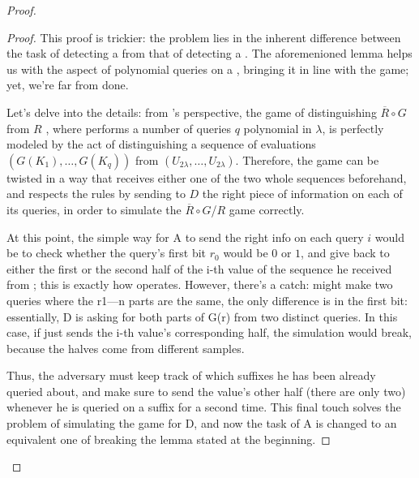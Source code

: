 \begin{proof}
    \begin{proof}


        This proof is trickier: the problem lies in the inherent difference between the task of detecting a \prg{} from that of detecting a \prf{}. The aforemenioned lemma helps us with the aspect of polynomial queries on a \prg{}, bringing it in line with the \prf{} game; yet, we're far from done.

        Let's delve into the details: from \adversary's perspective, the game of distinguishing $\overline{R} \circ G$ from $R$ , where \distinguisher{} performs a number of queries $q$ polynomial in $\lambda$, is perfectly modeled by the act of distinguishing a sequence of evaluations $(G(K_1), \dots, G(K_q))$ from $(U_{2\lambda}, \dots, U_{2\lambda})$. Therefore, the game can be twisted in a way that \adversary{} receives either one of the two whole sequences beforehand, and respects the rules by sending to $D$ the right piece of information on each of its queries, in order to simulate the $\overline{R} \circ G$/$R$ game correctly.

        At this point, the simple way for A to send the right info on each query $i$ would be to check whether the query's first bit $r_0$ would be $0$ or $1$, and give back to \distinguisher{} either the first or the second half of the i-th value of the sequence he received from \challenger{}; this is exactly how \ggm{} operates. However, there's a catch: \distinguisher{} might make two queries where the r1---n parts are the same, the only difference is in the first bit: essentially, D is asking for both parts of G(r) from two distinct queries. In this case, if \adversary{} just sends the i-th value's corresponding half, the simulation would break, because the halves come from different samples.
        
        Thus, the adversary must keep track of which suffixes he has been already queried about, and make sure to send the value's other half (there are only two) whenever he is queried on a suffix for a second time. This final touch solves the problem of simulating the game for D, and now the task of A is changed to an equivalent one of breaking the lemma stated at the beginning.
        
\end{proof}
\end{proof}
